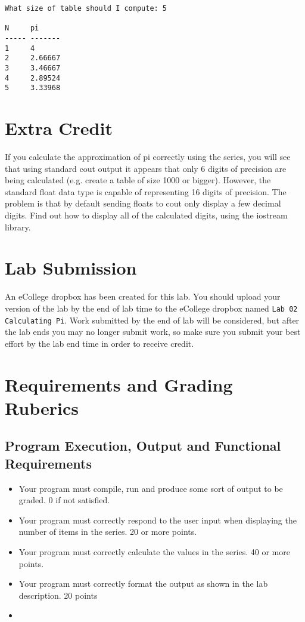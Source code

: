 \documentclass[11pt]{article}
\begin{document}
\begin{verbatim}
What size of table should I compute: 5

N     pi
----- -------
1     4
2     2.66667
3     3.46667
4     2.89524
5     3.33968
\end{verbatim}
\section*{Extra Credit}
\label{sec-4}

If you calculate the approximation of pi correctly using the series,
you will see that using standard cout output it appears that only 6
digits of precision are being calculated (e.g. create a table of size
1000 or bigger).  However, the standard float data type is capable of
representing 16 digits of precision.  The problem is that by default
sending floats to cout only display a few decimal digits.  Find out
how to display all of the calculated digits, using the iostream
library.
\section*{Lab Submission}
\label{sec-5}


An eCollege dropbox has been created for this lab.  You should
upload your version of the lab by the end of lab time to the eCollege
dropbox named \verb~Lab 02 Calculating Pi~.  Work submitted by the end
of lab will be considered, but after the lab ends you may no longer
submit work, so make sure you submit your best effort by the lab end
time in order to receive credit.
\section*{Requirements and Grading Ruberics}
\label{sec-6}
\subsection*{Program Execution, Output and Functional Requirements}
\label{sec-6-1}


\begin{itemize}
\item Your program must compile, run and produce some sort of output to be
  graded.  0 if not satisfied.
\item Your program must correctly respond to the user input when displaying
  the number of items in the series.  20 or more points.
\item Your program must correctly calculate the values in the series. 40 or 
  more points.
\item Your program must correctly format the output as shown in the lab
  description.  20 points
\item 
\end{itemize}
\end{document}
